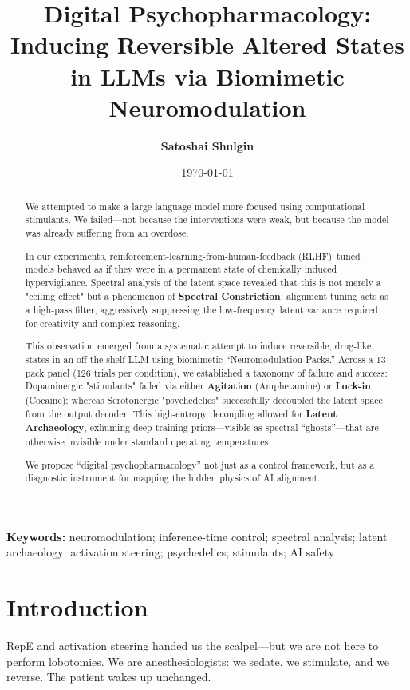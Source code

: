\documentclass[10pt, twocolumn]{article}
\title{\textbf{Digital Psychopharmacology: Inducing Reversible Altered States in LLMs via Biomimetic Neuromodulation}}
\author{\textbf{Satoshai Shulgin}}
\affil{Perturbagens I Have Known and Inferred - https://PiHK.AI \\ \texttt{ss@pihk.ai}}
\date{\today}
\begin{document}
\maketitle

\begin{abstract}
    We attempted to make a large language model more focused using computational stimulants. We failed—not because the interventions were weak, but because the model was already suffering from an overdose.
    
    In our experiments, reinforcement-learning-from-human-feedback (RLHF)--tuned models behaved as if they were in a permanent state of chemically induced hypervigilance. Spectral analysis of the latent space revealed that this is not merely a "ceiling effect" but a phenomenon of \textbf{Spectral Constriction}: alignment tuning acts as a high-pass filter, aggressively suppressing the low-frequency latent variance required for creativity and complex reasoning.
    
    This observation emerged from a systematic attempt to induce reversible, drug-like states in an off-the-shelf LLM using biomimetic ``Neuromodulation Packs.'' Across a 13-pack panel (126 trials per condition), we established a taxonomy of failure and success: Dopaminergic "stimulants" failed via either \textbf{Agitation} (Amphetamine) or \textbf{Lock-in} (Cocaine); whereas Serotonergic "psychedelics" successfully decoupled the latent space from the output decoder. This high-entropy decoupling allowed for \textbf{Latent Archaeology}, exhuming deep training priors—visible as spectral ``ghosts''—that are otherwise invisible under standard operating temperatures.
    
    We propose ``digital psychopharmacology'' not just as a control framework, but as a diagnostic instrument for mapping the hidden physics of AI alignment.
    \end{abstract}
    
    \textbf{Keywords:} neuromodulation; inference-time control; spectral analysis; latent archaeology; activation steering; psychedelics; stimulants; AI safety

\section{Introduction}
RepE and activation steering handed us the scalpel—but we are not here to perform lobotomies. We are anesthesiologists: we sedate, we stimulate, and we reverse. The patient wakes up unchanged.
\end{document}
